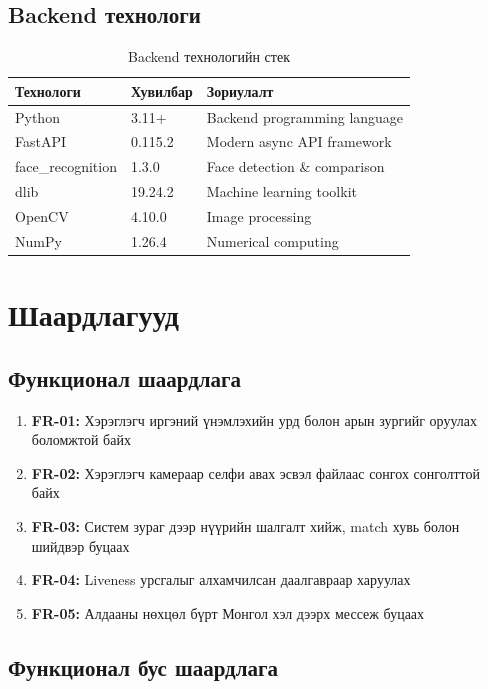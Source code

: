 \documentclass[12pt,a4paper]{article}
\begin{document}
\subsection{Backend технологи}

\begin{table}[H]
\centering
\begin{tabular}{|p{3.5cm}|p{2cm}|p{7cm}|}
\hline
\textbf{Технологи} & \textbf{Хувилбар} & \textbf{Зориулалт} \\
\hline
Python & 3.11+ & Backend programming language \\
\hline
FastAPI & 0.115.2 & Modern async API framework \\
\hline
face\_recognition & 1.3.0 & Face detection \& comparison \\
\hline
dlib & 19.24.2 & Machine learning toolkit \\
\hline
OpenCV & 4.10.0 & Image processing \\
\hline
NumPy & 1.26.4 & Numerical computing \\
\hline
\end{tabular}
\caption{Backend технологийн стек}
\end{table}

\section{Шаардлагууд}

\subsection{Функционал шаардлага}

\begin{enumerate}[leftmargin=1.2cm]
  \item \textbf{FR-01:} Хэрэглэгч иргэний үнэмлэхийн урд болон арын зургийг оруулах боломжтой байх
  \item \textbf{FR-02:} Хэрэглэгч камераар селфи авах эсвэл файлаас сонгох сонголттой байх
  \item \textbf{FR-03:} Систем зураг дээр нүүрийн шалгалт хийж, match хувь болон шийдвэр буцаах
  \item \textbf{FR-04:} Liveness урсгалыг алхамчилсан даалгавраар харуулах
  \item \textbf{FR-05:} Алдааны нөхцөл бүрт Монгол хэл дээрх мессеж буцаах
\end{enumerate}

\subsection{Функционал бус шаардлага}
\end{document}
